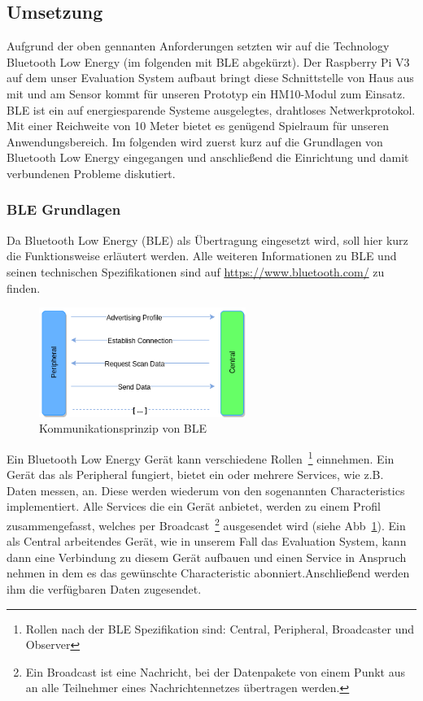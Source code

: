 \subsection{Umsetzung}
Aufgrund der oben gennanten Anforderungen setzten wir auf die Technology Bluetooth Low Energy (im folgenden mit BLE abgekürzt). Der Raspberry Pi V3 auf dem unser Evaluation System aufbaut bringt diese Schnittstelle von Haus aus mit und am Sensor kommt für unseren Prototyp ein HM10-Modul zum Einsatz. BLE ist ein auf energiesparende Systeme ausgelegtes, drahtloses Netwerkprotokol. Mit einer Reichweite von 10 Meter \cite{ble_spec} bietet es genügend Spielraum für unseren Anwendungsbereich. Im folgenden wird zuerst kurz auf die Grundlagen von Bluetooth Low Energy eingegangen und anschließend die Einrichtung und damit verbundenen Probleme diskutiert. 

\subsubsection{BLE Grundlagen}
\label{subsubsec:ble_gl}
Da Bluetooth Low Energy (BLE) als Übertragung eingesetzt wird, soll hier kurz die Funktionsweise erläutert werden. Alle weiteren Informationen zu BLE und seinen technischen Spezifikationen sind auf \url{https://www.bluetooth.com/} zu finden. 

\begin{figure}[ht]
	\centering
		\includegraphics[width=0.6\textwidth]{includes/kom/graphics/ble_connection}
	\caption{Kommunikationsprinzip von BLE}
	\label{fig:ble_comm}
\end{figure}

Ein Bluetooth Low Energy Gerät kann verschiedene Rollen~\footnote{Rollen nach der BLE Spezifikation sind: Central, Peripheral, Broadcaster und Observer} einnehmen. Ein Gerät das als Peripheral fungiert, bietet ein oder mehrere Services, wie z.B. Daten messen, an. Diese werden wiederum von den sogenannten Characteristics implementiert. Alle Services die ein Gerät anbietet, werden zu einem Profil zusammengefasst, welches per Broadcast~\footnote{Ein Broadcast ist eine Nachricht, bei der Datenpakete von einem Punkt aus an alle Teilnehmer eines Nachrichtennetzes übertragen werden. } ausgesendet wird (siehe Abb~\ref{fig:ble_comm}). Ein als Central arbeitendes Gerät, wie in unserem Fall das Evaluation System, kann dann eine Verbindung zu diesem Gerät aufbauen und einen Service in Anspruch nehmen in dem es das gewünschte Characteristic abonniert.Anschließend werden ihm die verfügbaren Daten zugesendet. 

